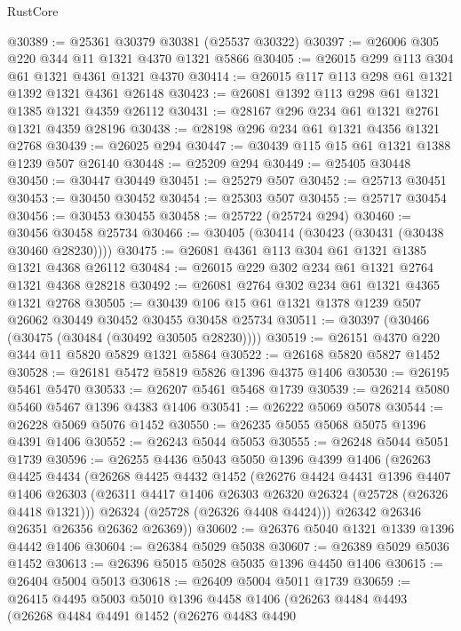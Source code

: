 \begin{lexlean}{RustCore}
\begin{coremodule}
@30389 := @25361 @30379 @30381 (@25537 @30322)
@30397 := @26006 @305 @220 @344 @11 @1321 @4370 @1321 @5866
@30405 := @26015 @299 @113 @304 @61 @1321 @4361 @1321 @4370
@30414 := @26015 @117 @113 @298 @61 @1321 @1392 @1321 @4361 @26148
@30423 := @26081 @1392 @113 @298 @61 @1321 @1385 @1321 @4359 @26112
@30431 := @28167 @296 @234 @61 @1321 @2761 @1321 @4359 @28196
@30438 := @28198 @296 @234 @61 @1321 @4356 @1321 @2768
@30439 := @26025 @294
@30447 := @30439 @115 @15 @61 @1321 @1388 @1239 @507 @26140
@30448 := @25209 @294
@30449 := @25405 @30448
@30450 := @30447 @30449
@30451 := @25279 @507
@30452 := @25713 @30451
@30453 := @30450 @30452
@30454 := @25303 @507
@30455 := @25717 @30454
@30456 := @30453 @30455
@30458 := @25722 (@25724 @294)
@30460 := @30456 @30458 @25734
@30466 := @30405 (@30414 (@30423 (@30431 (@30438 @30460 @28230))))
@30475 := @26081 @4361 @113 @304 @61 @1321 @1385 @1321 @4368 @26112
@30484 := @26015 @229 @302 @234 @61 @1321 @2764 @1321 @4368 @28218
@30492 := @26081 @2764 @302 @234 @61 @1321 @4365 @1321 @2768
@30505 := @30439 @106 @15 @61 @1321 @1378 @1239 @507 @26062 @30449 @30452 @30455 @30458 @25734
@30511 := @30397 (@30466 (@30475 (@30484 (@30492 @30505 @28230))))
@30519 := @26151 @4370 @220 @344 @11 @5820 @5829 @1321 @5864
@30522 := @26168 @5820 @5827 @1452
@30528 := @26181 @5472 @5819 @5826 @1396 @4375 @1406
@30530 := @26195 @5461 @5470
@30533 := @26207 @5461 @5468 @1739
@30539 := @26214 @5080 @5460 @5467 @1396 @4383 @1406
@30541 := @26222 @5069 @5078
@30544 := @26228 @5069 @5076 @1452
@30550 := @26235 @5055 @5068 @5075 @1396 @4391 @1406
@30552 := @26243 @5044 @5053
@30555 := @26248 @5044 @5051 @1739
@30596 := @26255
    @4436
    @5043
    @5050
    @1396
    @4399
    @1406
    (@26263
      @4425
      @4434
      (@26268
        @4425
        @4432
        @1452
        (@26276
          @4424
          @4431
          @1396
          @4407
          @1406
          @26303
          (@26311 @4417 @1406 @26303 @26320 @26324 (@25728 (@26326 @4418 @1321)))
          @26324
          (@25728 (@26326 @4408 @4424)))
        @26342
        @26346
        @26351
        @26356
        @26362
        @26369))
@30602 := @26376 @5040 @1321 @1339 @1396 @4442 @1406
@30604 := @26384 @5029 @5038
@30607 := @26389 @5029 @5036 @1452
@30613 := @26396 @5015 @5028 @5035 @1396 @4450 @1406
@30615 := @26404 @5004 @5013
@30618 := @26409 @5004 @5011 @1739
@30659 := @26415
    @4495
    @5003
    @5010
    @1396
    @4458
    @1406
    (@26263
      @4484
      @4493
      (@26268
        @4484
        @4491
        @1452
        (@26276
          @4483
          @4490

\end{coremodule}
\end{lexlean}

